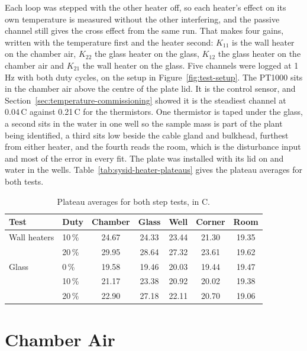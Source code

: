 Each loop was stepped with the other heater off, so each heater's effect on its own temperature is measured without the other interfering, and the passive channel still gives the cross effect from the same run. That makes four gains, written with the temperature first and the heater second: $K_{11}$ is the wall heater on the chamber air, $K_{22}$ the glass heater on the glass, $K_{12}$ the glass heater on the chamber air and $K_{21}$ the wall heater on the glass. Five channels were logged at 1\,Hz with both duty cycles, on the setup in Figure~\ref{fig:test-setup}. The PT1000 sits in the chamber air above the centre of the plate lid. It is the control sensor, and Section~\ref{sec:temperature-commissioning} showed it is the steadiest channel at 0.04\,\textdegree{}C against 0.21\,\textdegree{}C for the thermistors. One thermistor is taped under the glass, a second sits in the water in one well so the sample mass is part of the plant being identified, a third sits low beside the cable gland and bulkhead, furthest from either heater, and the fourth reads the room, which is the disturbance input and most of the error in every fit. The plate was installed with its lid on and water in the wells. Table~\ref{tab:sysid-heater-plateaus} gives the plateau averages for both tests.
\begin{table}[H]
    \centering
    \caption{Plateau averages for both step tests, in \textdegree{}C.}
    \label{tab:sysid-heater-plateaus}\label{tab:sysid-glass-plateaus}
    \small
    \begin{tabular}{llccccc}
        \toprule
        \textbf{Test} & \textbf{Duty} & \textbf{Chamber} & \textbf{Glass} & \textbf{Well} & \textbf{Corner} & \textbf{Room} \\
        \midrule
        Wall heaters & 10\,\% & 24.67 & 24.33 & 23.44 & 21.30 & 19.35 \\
                     & 20\,\% & 29.95 & 28.64 & 27.32 & 23.61 & 19.62 \\
        \midrule
        Glass & 0\,\%  & 19.58 & 19.46 & 20.03 & 19.44 & 19.47 \\
              & 10\,\% & 21.17 & 23.38 & 20.92 & 20.02 & 19.38 \\
              & 20\,\% & 22.90 & 27.18 & 22.11 & 20.70 & 19.06 \\
        \bottomrule
    \end{tabular}
\end{table}

\section{Chamber Air}
\label{sec:sysid-chamber}

